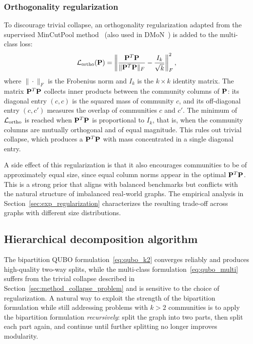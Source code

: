 \subsubsection{Orthogonality regularization}
\label{sec:method_ortho}

To discourage trivial collapse, an orthogonality regularization
adapted from the supervised MinCutPool method~\cite{bianchi2020spectral}
(also used in DMoN~\cite{tsitsulin2020graph}) is added to the
multi-class loss:
\begin{equation}
    \mathcal{L}_{\mathrm{ortho}}(\mathbf{P}) = \left\| \frac{\mathbf{P}^T \mathbf{P}}{\| \mathbf{P}^T
    \mathbf{P} \|_F} - \frac{I_k}{\sqrt{k}} \right\|_F^2,
    \label{eq:loss_ortho}
\end{equation}
where $\| \cdot \|_F$ is the Frobenius norm and $I_k$ is the
$k \times k$ identity matrix. The matrix $\mathbf{P}^T \mathbf{P}$ collects
inner products between the community columns of $\mathbf{P}$: its
diagonal entry $(c, c)$ is the squared mass of community $c$, and
its off-diagonal entry $(c, c')$ measures the overlap of
communities $c$ and $c'$. The minimum of
$\mathcal{L}_{\mathrm{ortho}}$ is reached when $\mathbf{P}^T \mathbf{P}$ is proportional
to $I_k$, that is, when the community columns are mutually
orthogonal and of equal magnitude. This rules out trivial
collapse, which produces a $\mathbf{P}^T \mathbf{P}$ with mass concentrated in a
single diagonal entry.

A side effect of this regularization is that it also encourages
communities to be of approximately equal size, since equal column
norms appear in the optimal $\mathbf{P}^T \mathbf{P}$. This is a strong prior
that aligns with balanced benchmarks but conflicts with the
natural structure of imbalanced real-world graphs. The empirical
analysis in Section~\ref{sec:exp_regularization} characterizes the
resulting trade-off across graphs with different size
distributions.

\subsection{Hierarchical decomposition algorithm}
\label{sec:method_hierarchical}

The bipartition QUBO formulation~\eqref{eq:qubo_k2} converges
reliably and produces high-quality two-way splits, while the
multi-class formulation~\eqref{eq:qubo_multi} suffers from the
trivial collapse described in Section~\ref{sec:method_collapse_problem}
and is sensitive to the choice of regularization. A natural way to
exploit the strength of the bipartition formulation while still
addressing problems with $k > 2$ communities is to apply the
bipartition formulation \emph{recursively}: split the graph into
two parts, then split each part again, and continue until further
splitting no longer improves modularity.

